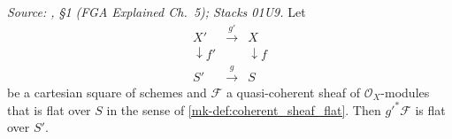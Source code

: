 \begin{lemma}\label{mk-lem:coherent_flat_base_change}
  \leanok

  \textit{Source: \cite{nitsure-hilbert-quot}, \S 1 (FGA Explained Ch.~5); Stacks 01U9.}
  Let
  \[
    \begin{array}{ccc}
      X' & \xrightarrow{\ g'\ } & X \\
      \downarrow f' & & \downarrow f \\
      S' & \xrightarrow{\ g\ } & S
    \end{array}
  \]
  be a cartesian square of schemes and \(\mathcal{F}\) a quasi-coherent sheaf
  of \(\mathcal{O}_X\)-modules that is flat over \(S\) in the sense of
  \ref{mk-def:coherent_sheaf_flat}.  Then \(g'^* \mathcal{F}\) is flat over
  \(S'\).
\end{lemma}
